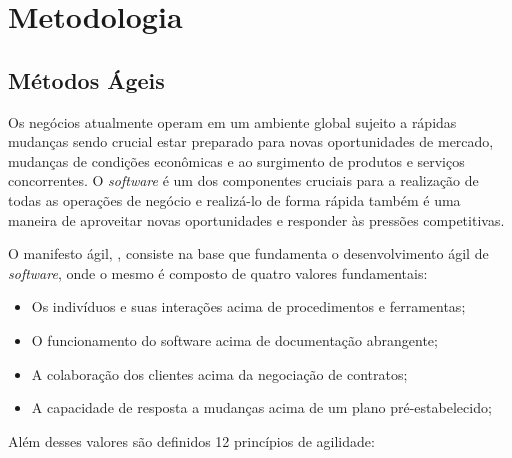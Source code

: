 \chapter{Metodologia}

\section{Métodos Ágeis}
Os negócios atualmente operam em um ambiente global sujeito a rápidas mudanças sendo crucial
estar preparado para novas oportunidades de mercado, mudanças de condições econômicas e ao surgimento
de produtos e serviços concorrentes. O \textit{software} é um dos componentes cruciais para a realização
de todas as operações de negócio e realizá-lo de forma rápida também é uma maneira de aproveitar novas
oportunidades e responder às pressões competitivas. \cite{sommerville_2006}

O manifesto ágil, \cite{beck2001agile}, consiste na base que fundamenta o desenvolvimento ágil de
\textit{software}, onde o mesmo é composto de quatro valores fundamentais:

\begin{itemize}
    \item Os indivíduos e suas interações acima de procedimentos e ferramentas;
    \item O funcionamento do software acima de documentação abrangente;
    \item A colaboração dos clientes acima da negociação de contratos;
    \item A capacidade de resposta a mudanças acima de um plano pré-estabelecido;
\end{itemize}

Além desses valores são definidos 12 princípios de agilidade:

